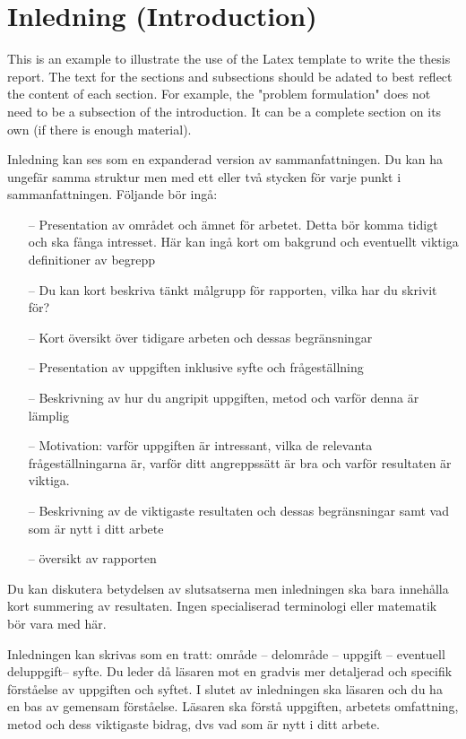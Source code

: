 \section{Inledning (Introduction)}
\label{sec:intro}

This is an example to illustrate the use of the Latex template to write the thesis report. The text for the sections and subsections should be adated to best reflect the content of each section. For example, the "problem formulation" does not need to be a subsection of the introduction. It can be a complete
section on its own (if there is enough material). 

Inledning kan ses som en expanderad version av sammanfattningen. Du kan ha ungefär samma struktur men med ett eller två stycken för varje punkt i sammanfattningen. Följande bör ingå:
\begin{itemize}
\item[--]	Presentation av området och ämnet för arbetet. Detta bör komma tidigt och ska fånga intresset. Här kan ingå kort om bakgrund och eventuellt viktiga definitioner av begrepp
\item[--]	Du kan kort beskriva tänkt målgrupp för rapporten, vilka har du skrivit för?
\item[--]	Kort översikt över tidigare arbeten och dessas begränsningar 
\item[--]	Presentation av uppgiften inklusive syfte och frågeställning
\item[--]	Beskrivning av hur du angripit uppgiften, metod och varför denna är lämplig
\item[--]	Motivation: varför uppgiften är intressant, vilka de relevanta frågeställningarna är, varför ditt angreppssätt är bra och varför resultaten är viktiga.
\item[--]	Beskrivning av de viktigaste resultaten och dessas begränsningar samt vad som är nytt i ditt arbete
\item[--]	översikt av rapporten
\end{itemize}

Du kan diskutera betydelsen av slutsatserna men inledningen ska bara innehålla kort summering av resultaten. Ingen specialiserad terminologi eller matematik bör vara med här. 

Inledningen kan skrivas som en tratt: område – delområde – uppgift – eventuell deluppgift– syfte. Du leder då läsaren mot en gradvis mer detaljerad och specifik förståelse av uppgiften och syftet. I slutet av inledningen ska läsaren och du ha en bas av gemensam förståelse. Läsaren ska förstå uppgiften, arbetets omfattning, metod och dess viktigaste bidrag, dvs vad som är nytt i ditt arbete. 


